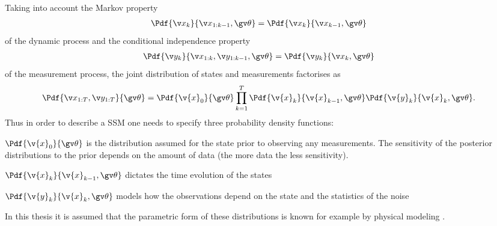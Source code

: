 Taking into account the Markov property
\begin{align}
	\Pdf{\xk}{\x_{1:k-1},\Th}&=\Pdf{\xk}{\x_{k-1},\Th}
\end{align}
of the dynamic process and the conditional
independence property 
\begin{align}
	\Pdf{\yk}{\x_{1:k},\y_{1:k-1},\Th}&=\Pdf{\yk}{\xk,\Th}
\end{align}
of the measurement process, the joint distribution of states
and measurements factorises as
\begin{align}
	\Pdf{\X,\Y}{\Th}&=\Pdf{\v{x}_0}{\Th}\prod_{k=1}^T\Pdf{\v{x}_k}{\v{x}_{k-1},\Th}\Pdf{\v{y}_k}{\v{x}_{k},\Th}
	\label{eq:complete_data_likelihood}.
\end{align}
Thus in order to describe a SSM one needs to specify three probability density functions:
\begin{description}
\addtolength{\leftskip}{1cm}
	\item[Prior distribution]
	$\Pdf{\v{x}_0}{\Th}$ is the distribution assumed for the state prior to observing any measurements. The
	sensitivity of the posterior distributions to the prior depends on the amount of data (the more data the less sensitivity).
	\item[Dynamic model]
	$\Pdf{\v{x}_k}{\v{x}_{k-1},\Th}$ dictates the time evolution of the states
	\item[Measurement model]
	$\Pdf{\v{y}_k}{\v{x}_{k},\Th}$ models how the observations depend on the state and the statistics of the noise
\end{description}
In this thesis it is assumed that the parametric form of these distributions is known
for example by physical modeling \parencite{ljung1994modeling}.

